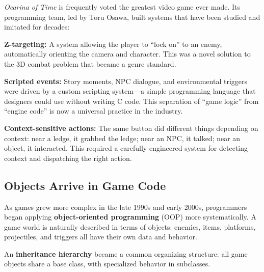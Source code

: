 \documentclass[11pt,letterpaper]{article}
\newcommand{\keyterm}[1]{\textbf{\textcolor{cssecondary}{#1}}}
\begin{document}
\begin{historybox}
\textit{Ocarina of Time} is frequently voted the greatest video game ever made. Its programming team, led by Toru Osawa, built systems that have been studied and imitated for decades:

\textbf{Z-targeting:} A system allowing the player to ``lock on'' to an enemy, automatically orienting the camera and character. This was a novel solution to the 3D combat problem that became a genre standard.

\textbf{Scripted events:} Story moments, NPC dialogue, and environmental triggers were driven by a custom scripting system---a simple programming language that designers could use without writing C code. This separation of ``game logic'' from ``engine code'' is now a universal practice in the industry.

\textbf{Context-sensitive actions:} The same button did different things depending on context: near a ledge, it grabbed the ledge; near an NPC, it talked; near an object, it interacted. This required a carefully engineered system for detecting context and dispatching the right action.
\end{historybox}

\subsection{Objects Arrive in Game Code}

As games grew more complex in the late 1990s and early 2000s, programmers began applying \keyterm{object-oriented programming} (OOP) more systematically. A game world is naturally described in terms of objects: enemies, items, platforms, projectiles, and triggers all have their own data and behavior.

An \keyterm{inheritance hierarchy} became a common organizing structure: all game objects share a base class, with specialized behavior in subclasses.
\end{document}
